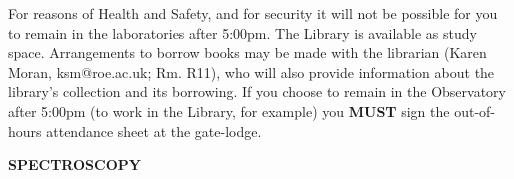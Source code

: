 \documentclass[12pt]{article}
\begin{document}
\noindent
For reasons of Health and Safety, and for security it will not be
possible for you to remain in the laboratories after 5:00pm. The
Library is available as study space. Arrangements to borrow books may
be made with the librarian (Karen Moran, ksm@roe.ac.uk; Rm. R11), who will also
provide information about the library's collection and its borrowing. If
you choose to remain in the Observatory after 5:00pm (to work in the
Library, for example) you {\bf MUST} sign the out-of-hours attendance
sheet at the gate-lodge.











































\newpage

\vspace*{6cm}

\begin{center}
{\Large\bf SPECTROSCOPY}
\end{center}
\newpage

\pagestyle{myheadings}
\setcounter{page}{1}



{\small
{}}
\vspace*{8mm}
\end{document}
